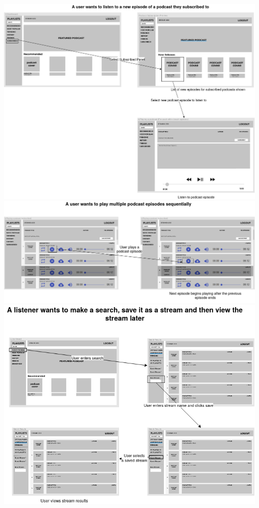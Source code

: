 \documentclass[12pt]{article}
\begin{document}
\begin{appendices}
\begin{center}
        \includegraphics[width=\textwidth]{resources/podcast_subscription_preview}
        \includegraphics[width=\textwidth]{resources/autoplay}
        \includegraphics[width=\textwidth]{resources/save_stream}
    \end{center}
\end{appendices}
\end{document}
